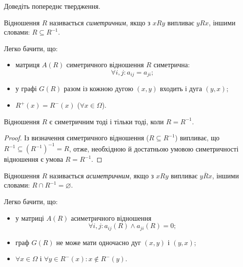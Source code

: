 \begin{exercise}
	Доведіть попереднє твердження.
\end{exercise}

\begin{definition}
	Відношення $R$ називається \textit{симетричним}, якщо з $x R y$ випливає $y R x$, іншими словами: $R \subseteq R^{-1}$.
\end{definition}

\begin{properties}
	Легко бачити, що:
	\begin{itemize}
		\item матриця $A(R)$ симетричного відношення $R$ симетрична: \begin{equation}\forall i, j: a_{ij} = a_{ji};\end{equation}
		\item у графі $G(R)$ разом із кожною дугою $(x, y)$ входить і дуга $(y, x)$; 
		\item $R^+(x) = R^-(x)$ ($\forall x \in \Omega$).
	\end{itemize}
\end{properties}

\begin{theorem}
	Відношення $R$ є симетричним тоді і тільки тоді, коли $R = R^{-1}$.
\end{theorem}

\begin{proof}
	Із визначення симетричного відношення ($R \subseteq R^{-1}$) випливає, що $R^{-1} \subseteq (R^{-1})^{-1} = R$, отже, необхідною й достатньою умовою симетричності відношення є умова $R = R^{-1}$.
\end{proof}

\begin{definition}
	Відношення $R$ називається \textit{асиметричним}, якщо з $x R y$ випливає $y \overline{R} x$, іншими словами: $R \cap R^{-1} = \varnothing$.
\end{definition}

\begin{properties}
	Легко бачити, що:
	\begin{itemize}
		\item у матриці $A(R)$ асиметричного відношення \begin{equation}\forall i, j: a_{ij}(R) \land a_{ji}(R) = 0;\end{equation}
		\item граф $G(R)$ не може мати одночасно дуг $(x,y)$ і $(y, x)$;
		\item $\forall x \in \Omega$ і $\forall y \in R^-(x): x \notin R^-(y)$.
	\end{itemize}
\end{properties}

